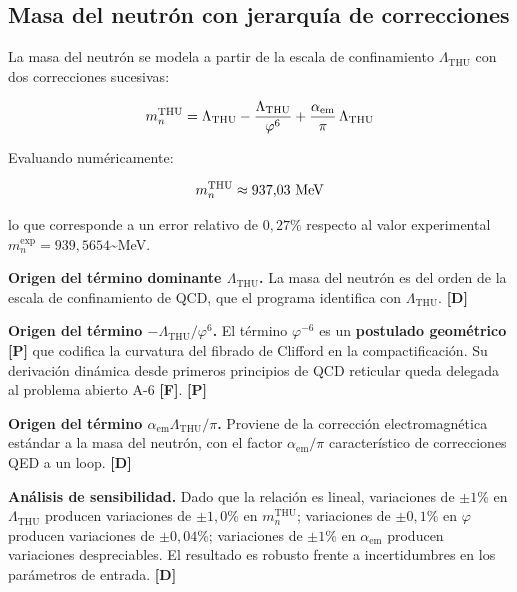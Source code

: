 ﻿\documentclass[11pt,letterpaper]{article}
\begin{document}
\subsection{Masa del neutrón con jerarquía de correcciones}
La masa del neutrón se modela a partir de la escala de confinamiento $\Lambda_{\text{THU}}$ con dos correcciones sucesivas:

\begin{equation*}
  \resizebox{\ifdim\width>\linewidth \linewidth\else\width\fi}{!}{$\displaystyle m_n^{\text{THU}} = \Lambda_{\text{THU}} - \frac{\Lambda_{\text{THU}}}{\varphi^6} + \frac{\alpha_{\text{em}}}{\pi}\,\Lambda_{\text{THU}}$}
\end{equation*}

Evaluando numéricamente:

\begin{equation*}
  \resizebox{\ifdim\width>\linewidth \linewidth\else\width\fi}{!}{$\displaystyle m_n^{\text{THU}} \approx 937{,}03\ \text{MeV}$}
\end{equation*}

lo que corresponde a un error relativo de $0{,}27\%$ respecto al valor experimental $m_n^{\text{exp}} = 939{,}5654$\textasciitilde{}MeV.

\textbf{Origen del término dominante $\Lambda_{\text{THU}}$.} La masa del neutrón es del orden de la escala de confinamiento de QCD, que el programa identifica con $\Lambda_{\text{THU}}$. \textbf{[D]}

\textbf{Origen del término $-\Lambda_{\text{THU}}/\varphi^6$.} El término $\varphi^{-6}$ es un \textbf{postulado geométrico [P]} que codifica la curvatura del fibrado de Clifford en la compactificación. Su derivación dinámica desde primeros principios de QCD reticular queda delegada al problema abierto A-6 \textbf{[F]}. \textbf{[P]}

\textbf{Origen del término $\alpha_{\text{em}}\Lambda_{\text{THU}}/\pi$.} Proviene de la corrección electromagnética estándar a la masa del neutrón, con el factor $\alpha_{\text{em}}/\pi$ característico de correcciones QED a un loop. \textbf{[D]}

\textbf{Análisis de sensibilidad.} Dado que la relación es lineal, variaciones de $\pm 1\%$ en $\Lambda_{\text{THU}}$ producen variaciones de $\pm 1{,}0\%$ en $m_n^{\text{THU}}$; variaciones de $\pm 0{,}1\%$ en $\varphi$ producen variaciones de $\pm 0{,}04\%$; variaciones de $\pm 1\%$ en $\alpha_{\text{em}}$ producen variaciones despreciables. El resultado es robusto frente a incertidumbres en los parámetros de entrada. \textbf{[D]}
\end{document}

